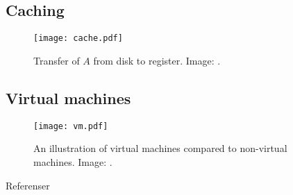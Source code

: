 \documentclass{beamer}
\begin{document}
\subsection{Caching}

\begin{frame}{\insertsubsectionhead}
  \begin{figure}
    \texttt{[image: cache.pdf]}
    \caption{Transfer of \(A\) from disk to register.
      Image: \cite[p.\ 28]{Silberschatz2009osc}.
    }
  \end{figure}
\end{frame}

\subsection{Virtual machines}

\begin{frame}{\insertsubsectionhead}
  \begin{figure}
    \texttt{[image: vm.pdf]}
    \caption{An illustration of virtual machines compared to non-virtual 
      machines.
      Image: \cite{Silberschatz2013intl}.
    }
  \end{figure}
\end{frame}



\begin{frame}[allowframebreaks]{Referenser}
  \small
  \printbibliography
\end{frame}
\end{document}
